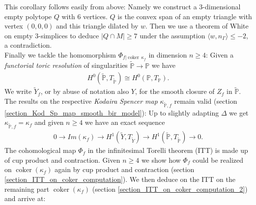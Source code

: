 \documentclass[12pt, english]{article}
\DeclareMathOperator{\coker}{coker}
\begin{document}
This corollary follows easily from above: Namely we construct a $3$-dimensional empty polytope $Q$ with $6$ vertices. $Q$ is the convex span of an empty triangle with vertex $(0,0,0)$ and this triangle dilated by $w$. Then we use a theorem of White on empty $3$-simplices to deduce $|Q \cap M| \geq 7$ under the assumption $\langle w,n_{\Gamma} \rangle \leq -2$, a contradiction.
\leavevmode 
\\ 

Finally we tackle the homomorphism $\Phi_{f \vert{\coker \, \kappa_f}}$ in dimension $n \geq 4$: Given a \textit{functorial toric resolution} of singularities $\tilde{\mathbb{P}} \rightarrow \mathbb{P}$ we have
\begin{align*}
	H^0(\tilde{\mathbb{P}}, T_{\tilde{\mathbb{P}}}) \cong H^0(\mathbb{P}, T_{\mathbb{P}}).
\end{align*}
We write $\tilde{Y}_f$, or by abuse of notation also $Y$, for the smooth closure of $Z_f$ in $\tilde{\mathbb{P}}$. The results on the respective \textit{Kodaira Spencer map} $\kappa_{\tilde{\mathbb{P}},f}$ remain valid (section \ref{section_Kod_Sp_map_smooth_bir_model}): Up to slightly adapting $\Delta$ we get $\kappa_{\tilde{\mathbb{P}},f} = \kappa_f$ and given $n \geq 4$ we have an exact sequence
\begin{align*}
	0 \rightarrow Im(\kappa_{f}) \rightarrow H^1(\tilde{Y}, T_{\tilde{Y}}) \rightarrow H^1(\tilde{\mathbb{P}}, T_{\tilde{\mathbb{P}}}) \rightarrow 0.
\end{align*}
The cohomological map $\Phi_f$ in the infinitesimal Torelli theorem (ITT) is made up of cup product and contraction. Given $n \geq 4$ we show how $\Phi_f$ could be realized on $\coker(\kappa_{f})$ again by cup product and contraction (section \ref{section_ITT_on_coker_computation}). We then deduce on the ITT on the remaining part $\coker(\kappa_{f})$ (section \ref{section_ITT_on_coker_computation_2}) and arrive at:
\end{document}
